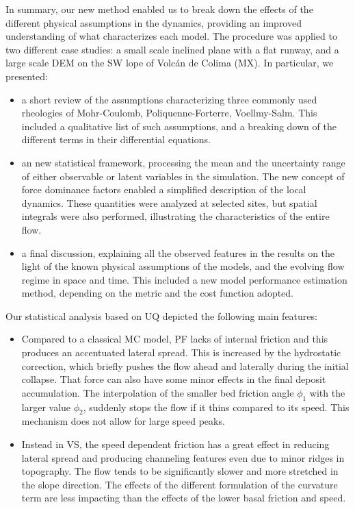 \documentclass{article}
\begin{document}
In summary, our new method enabled us to break down the effects of the different physical assumptions in the dynamics, providing an improved understanding of what characterizes each model. The procedure was applied to two different case studies: a small scale inclined plane with a flat runway, and a large scale DEM on the SW lope of Volc\'{a}n de Colima (MX). In particular, we presented:
\begin{itemize}
  \item a short review of the assumptions characterizing three commonly used rheologies of Mohr-Coulomb, Poliquenne-Forterre, Voellmy-Salm. This included a qualitative list of such assumptions, and a breaking down of the different terms in their differential equations.
  \item an new statistical framework, processing the mean and the uncertainty range of either observable or latent variables in the simulation. The new concept of force dominance factors enabled a simplified description of the local dynamics. These quantities were analyzed at selected sites, but spatial integrals were also performed, illustrating the characteristics of the entire flow.
  \item a final discussion, explaining all the observed features in the results on the light of the known physical assumptions of the models, and the evolving flow regime in space and time. This included a new model performance estimation method, depending on the metric and the cost function adopted.
\end{itemize}

Our statistical analysis based on UQ depicted the following main features: 
\begin{itemize}
  \item Compared to a classical MC model, PF lacks of internal friction and this produces an accentuated lateral spread. This is increased by the hydrostatic correction, which briefly pushes the flow ahead and laterally during the initial collapse. That force can also have some minor effects in the final deposit accumulation. The interpolation of the smaller bed friction angle $\phi_1$ with the larger value $\phi_2$, suddenly stops the flow if it thins compared to its speed. This mechanism does not allow for large speed peaks. 
  \item Instead in VS, the speed dependent friction has a great effect in reducing lateral spread and producing channeling features even due to minor ridges in topography. The flow tends to be significantly slower and more stretched in the slope direction. The effects of the different formulation of the curvature term are less impacting than the effects of the lower basal friction and speed.
\end{itemize}
\end{document}
